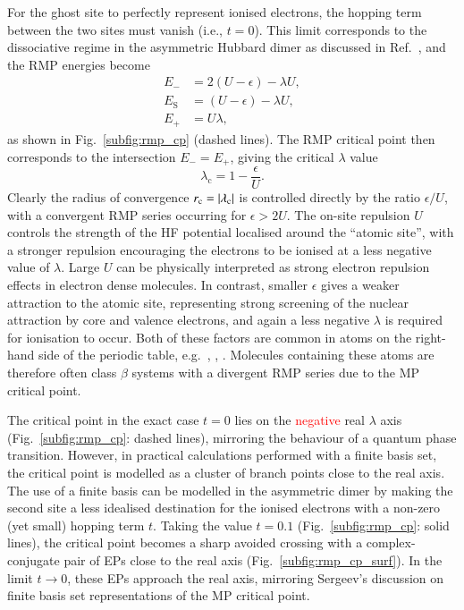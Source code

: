 \documentclass[aps,prb,reprint,noshowkeys,superscriptaddress]{revtex4-1}
\newcommand{\titou}[1]{\textcolor{red}{#1}}
\newcommand{\latin}[1]{#1}
\newcommand{\ie}{\latin{i.e.}}
\newcommand{\eg}{\latin{e.g.}}
\newcommand{\rc}{r_{\text{c}}}
\newcommand{\lc}{\lambda_{\text{c}}}
\begin{document}
For the ghost site to perfectly represent ionised electrons, the hopping term between the two sites must vanish (\ie, $t=0$).
This limit corresponds to the dissociative regime in the asymmetric Hubbard dimer as discussed in Ref.~, 
and the RMP energies become
\begin{subequations}
\begin{align}
    E_{-} &= 2(U - \epsilon) - \lambda U,
    \\
    E_{\text{S}} &= (U - \epsilon) - \lambda U,
    \\ 
    E_{+} &= U \lambda,
\end{align}
\end{subequations}
as shown in Fig.~\ref{subfig:rmp_cp} (dashed lines).
The RMP critical point then corresponds to the intersection $E_{-} = E_{+}$, giving the critical $\lambda$ value
\begin{equation}
    \lc = 1 - \frac{\epsilon}{U}. 
\end{equation}
Clearly the radius of convergence $\rc = \abs{\lc}$ is controlled directly by the ratio $\epsilon / U$, 
with a convergent RMP series occurring for $\epsilon > 2 U$.
The on-site repulsion $U$ controls the strength of the HF potential localised around the ``atomic site'', with a
stronger repulsion encouraging the electrons to be ionised at a less negative value of $\lambda$. 
Large $U$ can be physically interpreted as strong electron repulsion effects in electron dense molecules. 
In contrast, smaller $\epsilon$ gives a weaker attraction to the atomic site, 
representing strong screening of the nuclear attraction by core and valence electrons, 
and again a less negative $\lambda$ is required for ionisation to occur.
Both of these factors are common in atoms on the right-hand side of the periodic table, \eg\ ,
, .
Molecules containing these atoms are therefore often class $\beta$ systems with
a divergent RMP series due to the MP critical point. \cite{Goodson_2004,Sergeev_2006} 

The critical point in the exact case $t=0$ lies on the \titou{negative} real $\lambda$ axis (Fig.~\ref{subfig:rmp_cp}: dashed lines), 
mirroring the behaviour of a quantum phase transition.\cite{Kais_2006}
However, in practical calculations performed with a finite basis set, the critical point is modelled as a cluster
of branch points close to the real axis.
The use of a finite basis can be modelled in the asymmetric dimer by making the second site a less
idealised destination for the ionised electrons with a non-zero (yet small) hopping term $t$.
Taking the value $t=0.1$ (Fig.~\ref{subfig:rmp_cp}: solid lines), the critical point becomes a
sharp avoided crossing with a complex-conjugate pair of EPs close to the real axis (Fig.~\ref{subfig:rmp_cp_surf}).
In the limit $t \to 0$, these EPs approach the real axis, mirroring Sergeev's discussion on finite basis
set representations of the MP critical point.\cite{Sergeev_2006}
\end{document}
